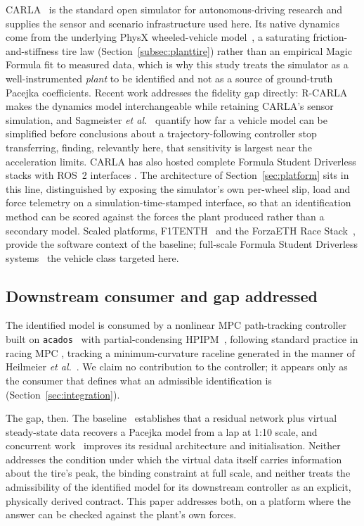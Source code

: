 CARLA~\cite{carla2017} is the standard open simulator for autonomous-driving
research and supplies the sensor and scenario infrastructure used here. Its
native dynamics come from the underlying PhysX wheeled-vehicle
model~\cite{physxvehicle}, a saturating friction-and-stiffness tire law
(Section~\ref{subsec:planttire}) rather than an empirical Magic Formula fit to
measured data, which is why this study treats the simulator as a
well-instrumented \emph{plant} to be identified and not as a source of
ground-truth Pacejka coefficients. Recent work addresses the fidelity gap
directly: R-CARLA~\cite{rcarla2025} makes the dynamics model interchangeable
while retaining CARLA's sensor simulation, and Sagmeister \emph{et
al.}~\cite{simfidelity2026} quantify how far a vehicle model can be simplified
before conclusions about a trajectory-following controller stop transferring,
finding, relevantly here, that sensitivity is largest near the acceleration
limits. CARLA has also hosted complete Formula Student Driverless stacks with
ROS~2 interfaces \cite{carlaros2025}. The architecture of
Section~\ref{sec:platform} sits in this line, distinguished by exposing the
simulator's own per-wheel slip, load and force telemetry on a
simulation-time-stamped interface, so that an identification method can be
scored against the forces the plant produced rather than a secondary model.
Scaled platforms, F1TENTH~\cite{f1tenth2020} and the ForzaETH Race
Stack~\cite{forzaeth2024}, provide the software context of the baseline;
full-scale Formula Student Driverless systems~\cite{amz2020} the vehicle class
targeted here.

\subsection{Downstream consumer and gap addressed}

The identified model is consumed by a nonlinear MPC path-tracking controller
built on \texttt{acados}~\cite{acados2022} with partial-condensing
HPIPM~\cite{hpipm2020}, following standard practice in racing MPC
\cite{liniger2015,kabzan2019lbmpc}, tracking a minimum-curvature raceline
generated in the manner of Heilmeier \emph{et al.}~\cite{heilmeier2020}. We
claim no contribution to the controller; it appears only as the consumer that
defines what an admissible identification is (Section~\ref{sec:integration}).

The gap, then. The baseline~\cite{ontrack2025} establishes that a residual
network plus virtual steady-state data recovers a Pacejka model from a lap at
1:10 scale, and concurrent work~\cite{visionsysid2026} improves its residual
architecture and initialisation. Neither addresses the condition under which
the virtual data itself carries information about the tire's peak, the binding
constraint at full scale, and neither treats the admissibility of the
identified model for its downstream controller as an explicit, physically
derived contract. This paper addresses both, on a platform where the answer can
be checked against the plant's own forces.
